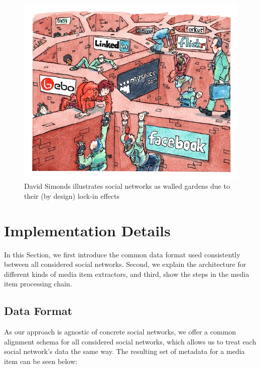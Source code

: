 \documentclass{acm_proc_article-sp}
\begin{document}
\begin{figure}
 \centering
 \includegraphics[width=1.0\linewidth,trim=16px 17px 12px 15px,clip]{./resources/davidsimonds.jpg}
 \caption{David Simonds illustrates social networks as walled gardens due to their (by design) lock-in effects~\cite{DavidSimonds}}
 \label{fig:DavidSimonds}
\end{figure}


\section{Implementation Details}                                            \label{sec:media-collector}
In this Section, we first introduce the common data format used consistently between all considered social networks.
Second, we explain the architecture for different kinds of media item extractors,
and third, show the steps in the media item processing chain.

\subsection{Data Format} \label{sec:dataformat}
As our approach is agnostic of concrete social networks, we offer a common alignment schema for all considered social networks,
which allows us to treat each social network's data the same way.
The resulting set of metadata for a media item can be seen below:
\end{document}
